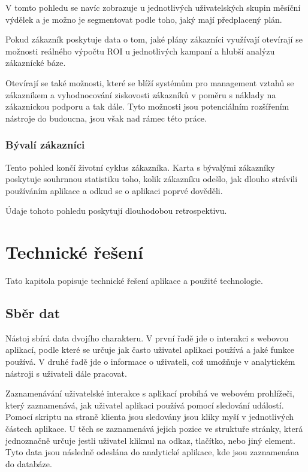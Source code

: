 \documentclass[bc,male,java,dept456]{diploma}						%
\begin{document}
V tomto pohledu se navíc zobrazuje u jednotlivých uživatelských skupin měsíční výdělek a je možno je segmentovat podle toho, jaký mají předplacený plán. 

Pokud zákazník poskytuje data o tom, jaké plány zákazníci využívají otevírají se možnosti reálného výpočtu ROI u jednotlivých kampaní a hlubší analýzu zákaznícké báze.

Otevírají se také možnosti, které se blíží systémům pro management vztahů se zá\-kaz\-ní\-kem a vyhodnocování ziskovosti zákazníků v poměru s náklady na zákaznickou podporu a tak dále. Tyto možnosti jsou potenciálním rozšířením nástroje do budoucna, jsou však nad rámec této práce.


\subsubsection{Bývalí zákazníci}

Tento pohled končí životní cyklus zákazníka. Karta s bývalými zákazníky poskytuje souhrnnou statistiku toho, kolik zákazníku odešlo, jak dlouho strávili používáním aplikace a odkud se o aplikaci poprvé dověděli.

Údaje tohoto pohledu poskytují dlouhodobou retrospektivu.




\section{Technické řešení}

Tato kapitola popisuje technické řešení aplikace a použité technologie. 



\subsection{Sběr dat}

Nástoj sbírá data dvojího charakteru. V první řadě jde o interakci s webovou aplikací, podle které se určuje jak často uživatel aplikaci používá a jaké funkce používá. V druhé řadě jde o informace o uživateli, což umožňuje v analytickém nástroji s uživateli dále pracovat.

Zaznamenávání uživatelské interakce s aplikací probíhá ve webovém prohlížeči, který zaznamenává, jak uživatel aplikaci používá pomocí sledování událostí. Pomocí skriptu na straně klienta jsou sledovány jsou kliky myší v jednotlivých částech aplikace. U těch se zaznamenává jejich pozice ve struktuře stránky, která jednoznačně určuje jestli uživatel kliknul na odkaz, tlačítko, nebo jiný element. Tyto data jsou následně odeslána do analytické aplikace, kde jsou zaznamenána do databáze.
\end{document}

